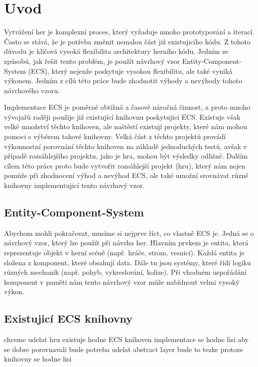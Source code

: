 \chapter{Uvod}
Vytváření her je komplexní proces, který vyžaduje mnoho prototypování a iterací. Často se stává, že je potřeba změnit nemalou část již existujicího kódu. Z tohoto důvodu je klíčová vysoká flexibilita architektury herního kódu. Jedním ze způsobů, jak řešit tento problém, je použít návrhový vzor Entity-Component-System (ECS), který nejenže poskytuje vysokou flexibilitu, ale také vyniká výkonem. Jedním z cílů této práce bude zhodnotit výhody a nevýhody tohoto návrhového vzoru.

Implementace ECS je poměrně obtížná a časově náročná činnost, a proto mnoho vývojařů raději použije již existující knihovnu poskytující ECS. Existuje však velké množství těchto knihoven, ale naštěstí existují projekty, které nám mohou pomoci s výběrem takové knihovny. Velká část z těchto projektů provádí výkonnostní porovnání těchto knihoven na základě jednoduchých testů, avšak v případě rozsáhlejšího projektu, jako je hra, mohou být výsledky odlišné. Dalším cílem této práce proto bude vytvořit rozsáhlejší projekt (hru), který nám nejen pomůže při zhodnocení výhod a nevýhod ECS, ale také umožní srovnávat různé knihovny implementujicí tento návrhový vzor.

\section{Entity-Component-System}
Abychom mohli pokračovat, musíme si nejprve říct, co vlastně ECS je. Jedná se o návrhový vzor, který lze použít při návrhu her. Hlavním prvkem je entita, která reprezentuje objekt v herní scéně (např. hráče, strom, vesnici). Každá entita je složena z komponent, které obsahují data. Dále tu jsou systémy, které řídí logiku různých mechanik (např. pohyb, vykreslování, kolize). Při vhodném uspořádání komponent v paměti nám tento návrhový vzor může nabídnout velmi vysoký výkon.

\section{Existujicí ECS knihovny}


chceme udelat hru
existuje hodne ECS knihoven
implementace se hodne lisi
aby se dobre porovnavali bude potreba udelat abstract layer
bude to tezke protoze knihovny se hodne lisi


\iffalse

